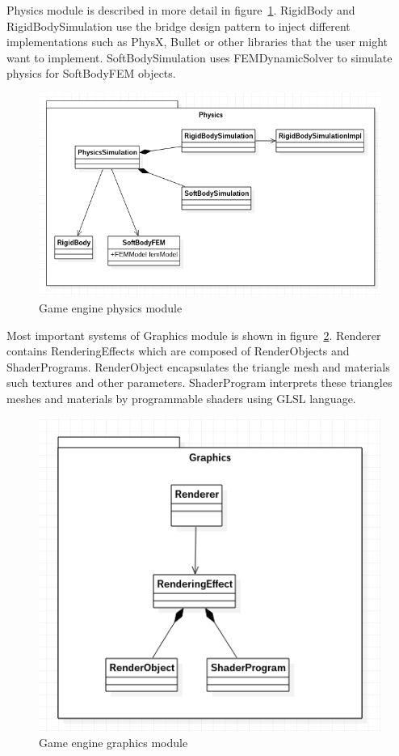 \documentclass[en]{minipw} %
\begin{document}
Physics module is described in more detail in figure~\ref{fig:ifx_physics}. RigidBody and RigidBodySimulation use the bridge design pattern to inject different implementations such as PhysX, Bullet or other libraries that the user might want to implement. SoftBodySimulation uses FEMDynamicSolver to simulate physics for SoftBodyFEM objects.

\begin{figure}[h!]
\centering
\includegraphics[scale=0.5]{pictures/ifx_physics.png}
\caption[Game engine physics module]{Game engine physics module}
\label{fig:ifx_physics}
\end{figure}

Most important systems of Graphics module is shown in figure~\ref{fig:ifx_graphics}. Renderer contains RenderingEffects which are composed of RenderObjects and ShaderPrograms. RenderObject encapsulates the triangle mesh and materials such textures and other parameters. ShaderProgram interprets these triangles meshes and materials by programmable shaders using GLSL language.

\begin{figure}[h!]
\centering
\includegraphics[scale=0.5]{pictures/ifx_graphics.png}
\caption[Game engine graphics module]{Game engine graphics module}
\label{fig:ifx_graphics}
\end{figure}
\end{document}
